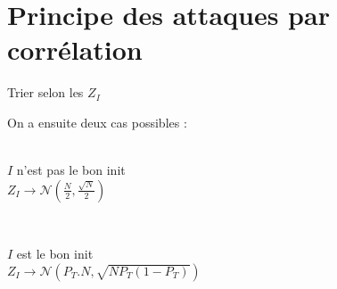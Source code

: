 \section{Principe des attaques par corrélation}
\begin{algorithm}[H]
    Trier selon les $Z_I$
\end{algorithm}
On a ensuite deux cas possibles :\\~\\
\begin{minipage}{.49\textwidth}
$I$ n'est pas le bon init\\
$Z_I \rightarrow \mathscr{N}\left(\frac{N}{2},\frac{\sqrt{N}}{2}\right)$
\end{minipage}
~
\begin{minipage}{.49\textwidth}
$I$ est le bon init\\
$Z_I \rightarrow \mathscr{N}\left(P_T.N,\sqrt{NP_T(1-P_T)}\right)$
\end{minipage}

